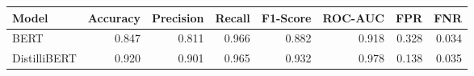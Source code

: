 \begin{tabular}{|l||r|r|r|r|r|r|r|}
\toprule
Model & \textbf{Accuracy} & \textbf{Precision} & Recall & \textbf{F1-Score} & \textbf{ROC-AUC} & \textbf{FPR} & FNR \\
\midrule \midrule
BERT & 0.847 & 0.811 & 0.966 & 0.882 & 0.918 & 0.328 & 0.034 \\
DistilliBERT & 0.920 & 0.901 & 0.965 & 0.932 & 0.978 & 0.138 & 0.035 \\
\bottomrule
\end{tabular}

